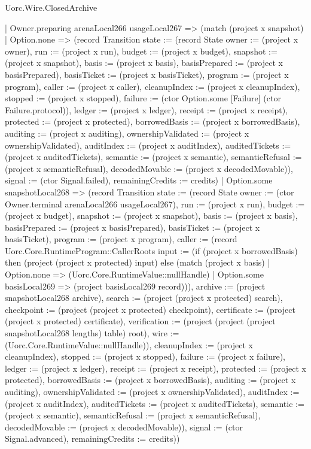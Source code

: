 \begin{lexlean}{Uorc.Wire.ClosedArchive}
\begin{semanticmodule}
{    | Owner.preparing arenaLocal266 usageLocal267 => (match (project x snapshot)
      | Option.none => (record Transition {state := (record State {owner := (project x owner), run := (project x run), budget := (project x budget), snapshot := (project x snapshot), basis := (project x basis), basisPrepared := (project x basisPrepared), basisTicket := (project x basisTicket), program := (project x program), caller := (project x caller), cleanupIndex := (project x cleanupIndex), stopped := (project x stopped), failure := (ctor Option.some [Failure] (ctor Failure.protocol)), ledger := (project x ledger), receipt := (project x receipt), protected := (project x protected), borrowedBasis := (project x borrowedBasis), auditing := (project x auditing), ownershipValidated := (project x ownershipValidated), auditIndex := (project x auditIndex), auditedTickets := (project x auditedTickets), semantic := (project x semantic), semanticRefusal := (project x semanticRefusal), decodedMovable := (project x decodedMovable)}), signal := (ctor Signal.failed), remainingCredits := credits})
      | Option.some snapshotLocal268 => (record Transition {state := (record State {owner := (ctor Owner.terminal arenaLocal266 usageLocal267), run := (project x run), budget := (project x budget), snapshot := (project x snapshot), basis := (project x basis), basisPrepared := (project x basisPrepared), basisTicket := (project x basisTicket), program := (project x program), caller := (record Uorc.Core.RuntimeProgram::CallerRoots {input := (if (project x borrowedBasis) then (project (project x protected) input) else (match (project x basis)
        | Option.none => (Uorc.Core.RuntimeValue::nullHandle)
        | Option.some basisLocal269 => (project basisLocal269 record))), archive := (project snapshotLocal268 archive), search := (project (project x protected) search), checkpoint := (project (project x protected) checkpoint), certificate := (project (project x protected) certificate), verification := (project (project (project snapshotLocal268 lengths) table) root), wire := (Uorc.Core.RuntimeValue::nullHandle)}), cleanupIndex := (project x cleanupIndex), stopped := (project x stopped), failure := (project x failure), ledger := (project x ledger), receipt := (project x receipt), protected := (project x protected), borrowedBasis := (project x borrowedBasis), auditing := (project x auditing), ownershipValidated := (project x ownershipValidated), auditIndex := (project x auditIndex), auditedTickets := (project x auditedTickets), semantic := (project x semantic), semanticRefusal := (project x semanticRefusal), decodedMovable := (project x decodedMovable)}), signal := (ctor Signal.advanced), remainingCredits := credits}))
}
\end{semanticmodule}
\end{lexlean}
